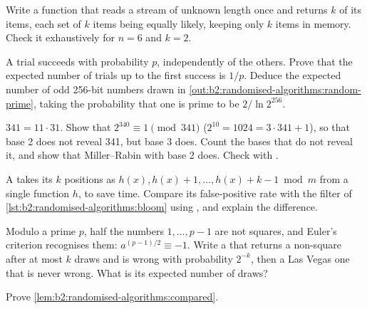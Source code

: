 \begin{exercise}[$\star$]\label{exo:b2:randomised-algorithms:3}
Write a function that reads a stream of unknown length once and returns $k$ of its items, each set of $k$ items being
equally likely, keeping only $k$ items in memory. Check it exhaustively for $n = 6$ and $k = 2$.
\end{exercise}

\begin{exercise}[$\star$]\label{exo:b2:randomised-algorithms:4}
A trial succeeds with probability $p$, independently of the others. Prove that the expected number of trials up to the
first success is $1/p$. Deduce the expected number of odd 256-bit numbers drawn in \cref{out:b2:randomised-algorithms:random-prime},
taking the probability that one is prime to be $2/\ln 2^{256}$.
\end{exercise}

\begin{exercise}[$\star\star$]\label{exo:b2:randomised-algorithms:5}
$341 = 11 \cdot 31$. Show that $2^{340} \equiv 1 \pmod{341}$ ($2^{10} = 1024 = 3 \cdot 341 + 1$), so that base 2 does not
reveal 341, but base 3 does. Count the bases that do not reveal it, and show that Miller--Rabin with base 2 does. Check
with .
\end{exercise}

\begin{exercise}[$\star\star$]\label{exo:b2:randomised-algorithms:6}
A  takes its $k$ positions as $h(x), h(x) + 1, \dots, h(x) + k - 1 \bmod m$ from a single function $h$, to
save time. Compare its false-positive rate with the filter of \cref{lst:b2:randomised-algorithms:bloom} using
, and explain the difference.
\end{exercise}

\begin{exercise}[$\star\star$]\label{exo:b2:randomised-algorithms:7}
Modulo a prime $p$, half the numbers $1, \dots, p - 1$ are not squares, and Euler's criterion recognises them: $a^{(p -
1)/2} \equiv -1$. Write a  that returns a non-square after at most $k$ draws and is wrong with
probability $2^{-k}$, then a Las Vegas one that is never wrong. What is its expected number of draws?
\end{exercise}

\begin{exercise}[$\star\star$]\label{exo:b2:randomised-algorithms:8}
Prove \cref{lem:b2:randomised-algorithms:compared}.
\end{exercise}

